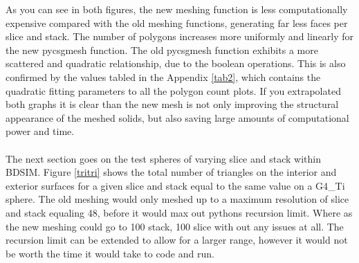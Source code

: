 \documentclass[12pt,a4paper]{article}
\begin{document}
\newpage
\noindent As you can see in both figures, the new meshing function is less computationally expensive compared with the old meshing functions, generating far less faces per slice and stack. The number of polygons increases more uniformly and linearly for the new pycsgmesh function. The old pycsgmesh function exhibits a more scattered and quadratic relationship, due to the boolean operations. This is also confirmed by the values tabled in the Appendix \ref{tab2}, which contains the quadratic fitting parameters to all the polygon count plots. If you extrapolated both graphs it is clear than the new mesh is not only improving the structural appearance of the meshed solids, but also saving large amounts of computational power and time.
\\\\
\label{recur}
\noindent The next section goes on the test spheres of varying slice and stack within BDSIM. Figure \ref{tritri} shows the total number of triangles on the interior and exterior surfaces for a given slice and stack equal to the same value on a G4\_Ti sphere. The old meshing would only meshed up to a maximum resolution of slice and stack equaling 48, before it would max out pythons recursion limit. Where as the new meshing could go to 100 stack, 100 slice with out any issues at all. The recursion limit can be extended to allow for a larger range, however it would not be worth the time it would take to code and run.
\end{document}
